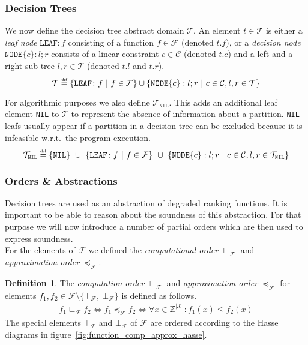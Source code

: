\documentclass[11pt,a4paper,titlepage]{article}
\theoremstyle{definition}
\newtheorem{definition}{Definition}[section]
\newcommand\eqdef{\mathrel{\overset{\makebox[0pt]{\mbox{\normalfont\tiny\sffamily def}}}{=}}}
\begin{document}
\subsubsection*{Decision Trees}

We now define the decision tree abstract domain $\mathcal{T}$.
An element $t \in \mathcal{T}$ is either a \textit{leaf node} $\mathtt{LEAF} \colon f$ consisting of a function $f \in \mathcal{F}$ (denoted $t.f$),
or a \textit{decision node} $\mathtt{NODE}\{c\}: l; r$ consists of a linear constraint $c \in \mathcal{C}$ (denoted $t.c$) 
and a left and a right sub tree $l, r \in \mathcal{T}$ 
(denoted $t.l$ and $t.r$).
\[
    \mathcal{T} \eqdef \{\mathtt{LEAF} \colon f \ | \ f \in \mathcal{F}\} \cup \{\mathtt{NODE}\{c\}: l; r \ | \ c \in \mathcal{C}, l, r \in \mathcal{T} \} 
\]

For algorithmic purposes we also define $\mathcal{T}_{\mathtt{NIL}}$. 
This adds an additional leaf element \texttt{NIL} to $\mathcal{T}$ to represent the absence of information about a partition.
\texttt{NIL} leafs usually appear if a partition in a decision tree can be excluded because it is infeasible w.r.t.\ the program execution.
\[
    \mathcal{T}_{\mathtt{NIL}} \eqdef \{\mathtt{NIL}\} \ \cup \ \{\mathtt{LEAF} \colon f \ | 
    \ f \in \mathcal{F}\} \ \cup \ \{\mathtt{NODE}\{c\}: l; r \ | \ c \in \mathcal{C}, l, r \in \mathcal{T}_{\mathtt{NIL}}  \} 
\]


\subsubsection*{Orders \& Abstractions}

Decision trees are used as an abstraction of degraded ranking functions. It is important to be able to reason about the soundness of this abstraction.
For that purpose we will now introduce a number of partial orders which are then used to express soundness.\\

For the elements of $\mathcal{F}$ we defined the \textit{computational order} $\sqsubseteq_{\mathcal{F}}$ 
and \textit{approximation order} $\preceq_{\mathcal{F}}$.

\begin{definition}\label{def:fun_comp_approx_order}
    The \textit{computation order} $\sqsubseteq_{\mathcal{F}}$ and \textit{approximation order} $\preceq_{\mathcal{F}}$
    for elements  $f_1, f_2 \in \mathcal{F} \setminus \{\top_{\mathcal{F}}, \ \bot_{\mathcal{F}} \} $ is defined as follows.
    \begin{align*}
        f_1 \sqsubseteq_{\mathcal{F}} f_2  \iff  f_1 \preceq_{\mathcal{F}} f_2 \iff
        \forall x \in \mathbb{Z}^{|\mathcal{X}|} \colon f_1(x) \leq f_2(x)
    \end{align*}
    The special elements $\top_{\mathcal{F}}$ and $\bot_{\mathcal{F}}$ of $\mathcal{F}$ are ordered according to the Hasse 
    diagrams in figure~\ref{fig:function_comp_approx_hasse}. 
\end{definition}
\end{document}
